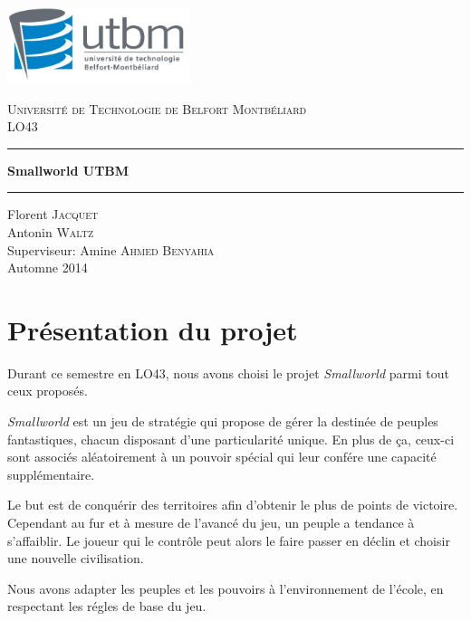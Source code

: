 \documentclass[a4paper]{report}
\begin{document}
\begin{titlepage}
    \includegraphics[width=0.4\textwidth]{logo_utbm.png}
    \begin{center}
        \textsc{\LARGE Université de Technologie de Belfort Montbéliard}\\[1cm]
        \textsc{\Large LO43}\\
        \rule{\linewidth}{0.5mm}
        { \huge \bfseries Smallworld UTBM\\[0.4cm] }
        \rule{\linewidth}{0.5mm}
        \vskip1cm
        Florent \textsc{Jacquet}\\
        Antonin \textsc{Waltz}\\
        Superviseur: Amine \textsc{Ahmed Benyahia}\\
        \vskip1cm
        \vfill
        {\large Automne 2014}
    \end{center}
\end{titlepage}
\newpage
\tableofcontents
\listoffigures
\newpage
\chapter{Présentation du projet}
\par
Durant ce semestre en LO43, nous avons choisi le projet \textit{Smallworld}
parmi tout ceux proposés.
\par
\textit{Smallworld} est un jeu de stratégie qui propose de gérer la destinée de
peuples fantastiques, chacun disposant d'une particularité unique. En plus de
ça, ceux-ci sont associés aléatoirement à un pouvoir spécial qui leur confére
une capacité supplémentaire.
\par
Le but est de conquérir des territoires afin d'obtenir le plus de points de
victoire. Cependant au fur et à mesure de l'avancé du jeu, un peuple a tendance
à s'affaiblir.  Le joueur qui le contrôle peut alors le faire passer en déclin
et choisir une nouvelle civilisation.
\par
Nous avons adapter les peuples et les pouvoirs à l'environnement de l'école, en
respectant les régles de base du jeu.
\newpage
\end{document}
